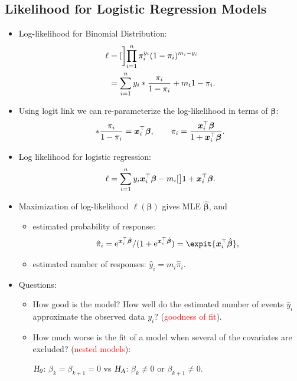 \documentclass[oneside]{book}\usepackage[]{graphicx}\usepackage[svgnames]{xcolor}
\let\exp\relax%
\let\log\relax%
\newcommand{\HN}{\textsl{H}_{\textsl{0}}}%
\newcommand{\HA}{\textsl{H}_{\textsl{A}}}%
\providecommand{\Vector}[1]{\bm{#1}}%
\begin{document}
\subsection*{Likelihood for Logistic Regression Models}
\begin{itemize}
      \item Log-likelihood for Binomial Distribution:
            \begin{align*}
                  \ell
                   & =\log[\bigg]{\prod_{i=1}^n \pi_i^{y_i}(1-\pi_i)^{m_i-y_i}}        \\
                   & =\sum_{i=1}^{n} y_i\log*{\frac{\pi_i}{1-\pi_i}}+m_i\log{1-\pi_i}.
            \end{align*}
      \item Using logit link we can re-parameterize the log-likelihood in terms of $ \Vector{\beta} $:
            \[ \log*{\frac{\pi_i}{1-\pi_i}}=\Vector{x}_i^\top \Vector{\beta},\qquad \pi_i=\frac{\exp{\Vector{x}_i^\top \Vector{\beta}}}{1+\exp{\Vector{x}_i^\top \Vector{\beta}}}. \]
      \item Log likelihood for logistic regression:
            \[ \ell=\sum_{i=1}^{n} y_i\Vector{x}_i^\top \Vector{\beta}-m_i\log[\big]{1+\exp{\Vector{x}_i^\top \Vector{\beta}}}. \]
      \item Maximization of log-likelihood $ \ell(\Vector{\beta}) $ gives MLE $ \hat{\Vector{\beta}} $, and
            \begin{itemize}
                  \item estimated probability of response:
                        \[ \hat{\pi}_i=\mathrm{e}^{\Vector{x}_i^\top \hat{\Vector{\beta}}}/(1+\mathrm{e}^{\Vector{x}_i^\top \hat{\Vector{\beta}}})=\expit{\Vector{x}_i^\top \hat{\Vector{\beta}}}, \]
                  \item estimated number of responses: $ \hat{y}_i=m_i\hat{\pi}_i $.
            \end{itemize}
      \item Questions:
            \begin{itemize}
                  \item How good is the model? How well do the estimated number of events $ \hat{y}_i $ approximate the observed data $ y_i $? (\textcolor{Red}{goodness of fit}).
                  \item How much worse is the fit of a model when several of the covariates are excluded? (\textcolor{Red}{nested models}):
                        \begin{center}
                              $ \HN $: $ \beta_k=\beta_{k+1}=0 $ vs $ \HA $: $ \beta_k\ne 0 $ or $ \beta_{k+1}\ne 0 $.
                        \end{center}
            \end{itemize}
\end{itemize}
\end{document}
